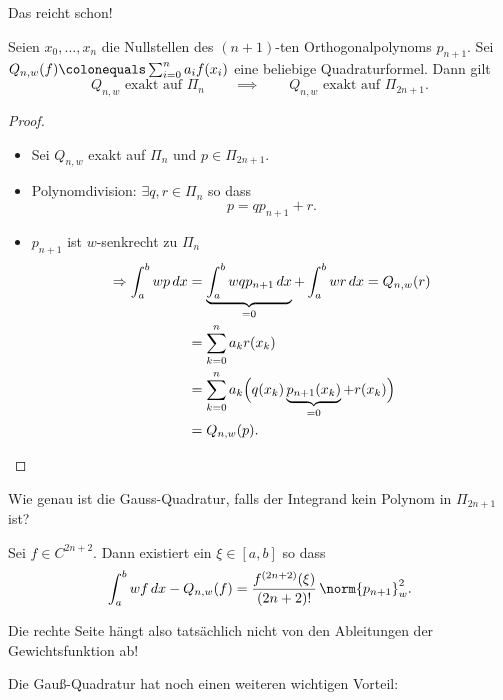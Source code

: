 \bigskip

Das reicht schon!
\begin{lemma}
Seien $x_0, \dots, x_n$ die Nullstellen des $(n+1)$-ten Orthogonalpolynoms $p_{n+1}$.
Sei $Q_{n,w}(f) \colonequals \sum_{i=0}^n a_i f(x_i)$ eine beliebige Quadraturformel.
Dann gilt
\begin{equation*}
 \text{$Q_{n,w}$ exakt auf $\Pi_n$}
 \qquad \implies \qquad
 \text{$Q_{n,w}$ exakt auf $\Pi_{2n +1}$}.
\end{equation*}
\end{lemma}
\begin{proof}\mbox{}
\begin{itemize}
\item Sei $Q_{n,w}$ exakt auf $\Pi_n$ und $p \in \Pi_{2n +1}$.
\item Polynomdivision: $\exists q, r \in \Pi_n$ so dass
\begin{equation*}
p = qp_{n+1}  + r.
\end{equation*}
\item $p_{n+1}$ ist $w$-senkrecht zu  $\Pi_n$
\begin{align*}
\Rightarrow \int_a^b wp \,dx
 & =
 \underbrace{\int_a^b wqp_{n+1} \,dx}_{= 0} + \int_a^b wr \,dx = Q_{n,w}(r) \\
 & =
 \sum_{k = 0}^n a_k r(x_k) \\
 & =
 \sum_{k = 0}^n a_k \Big( q(x_k) \underbrace{p_{n+1}(x_k)}_{= 0} + r(x_k)\Big) \\
 & =
 Q_{n,w}(p). \qedhere
\end{align*}
\end{itemize}
\end{proof}

Wie genau ist die Gauss-Quadratur, falls der Integrand kein Polynom in $\Pi_{2n+1}$ ist?

\begin{satz}
Sei $f \in C^{2n + 2}$. Dann existiert ein $\xi \in [a,b]$ so dass
\begin{equation*}
\int_a^b wf \,dx - Q_{n,w}(f)
=
\frac{f^{(2n+2)}(\xi)}{(2n+2)!} \, \norm{p_{n+1}}^2_w.
\end{equation*}
\end{satz}
Die rechte Seite hängt also tatsächlich nicht von den Ableitungen der Gewichtsfunktion ab!

\bigskip

Die Gauß-Quadratur hat noch einen weiteren wichtigen Vorteil:

